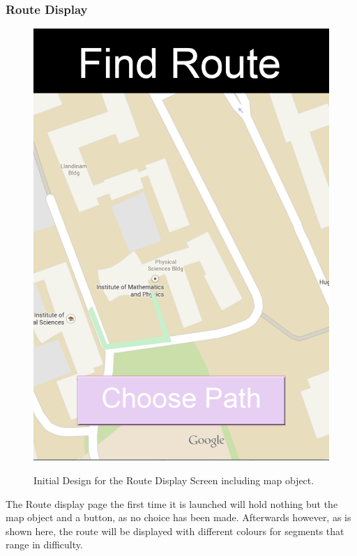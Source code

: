 \subsubsection{Route Display}
\begin{figure}[h]
\includegraphics[scale=0.6]{Design/Route.png}\\
\caption[Initial Find Route]{Initial Design for the Route Display Screen including map object.}
\end{figure}
The Route display page the first time it is launched will hold nothing but the map object and a button, as no choice has been made. Afterwards however, as is shown here, the route will be displayed with different colours for segments that range in difficulty.
\newpage

